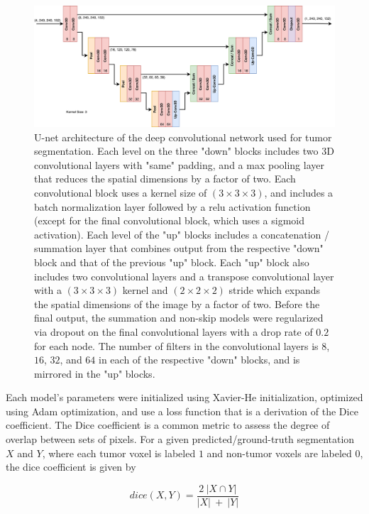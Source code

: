 \documentclass{article}
\begin{document}
\begin{figure}[!ht]
\centering
\includegraphics[width=\textwidth]{model_arch}
\caption{U-net architecture of the deep convolutional network used for tumor segmentation. Each level on the three "down" blocks includes two 3D convolutional layers with "same" padding, and a max pooling layer that reduces the spatial dimensions by a factor of two. Each convolutional block uses a kernel size of $(3 \times 3 \times 3)$, and includes a batch normalization layer followed by a relu activation function (except for the final convolutional block, which uses a sigmoid activation). Each level of the "up" blocks includes a concatenation / summation layer that combines output from the respective "down" block and that of the previous "up" block. Each "up" block also includes two convolutional layers and a transpose convolutional layer with a $(3 \times 3 \times 3)$ kernel and $(2 \times 2 \times 2)$ stride which expands the spatial dimensions of the image by a factor of two. Before the final output, the summation and non-skip models were regularized via dropout on the final convolutional layers with a drop rate of $0.2$ for each node. The number of filters in the convolutional layers is $8$, $16$, $32$, and $64$ in each of the respective "down" blocks, and is mirrored in the "up" blocks. }
\end{figure}

Each model's parameters were initialized using Xavier-He initialization, optimized using Adam optimization, and use a loss function that is a derivation of the Dice coefficient. The Dice coefficient is a common metric to assess the degree of overlap between sets of pixels. For a given predicted/ground-truth segmentation $X$ and $Y$, where each tumor voxel is labeled $1$ and non-tumor voxels are labeled $0$, the dice coefficient is given by

\begin{equation}
dice(X, Y) = \frac{2 \ |X \cap Y|}{|X| \ + \ |Y|}
\end{equation}
\end{document}
